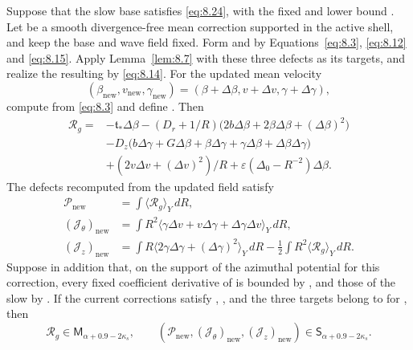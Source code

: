 \begin{lemma}\label{lem:8.8}
Suppose that the slow base satisfies \eqref{eq:8.24}, with the fixed
 and lower bound
. Let
 be a smooth divergence-free mean correction supported in
the active shell, and keep the base and wave field  fixed. Form
 and
 by Equations~\eqref{eq:8.3},
\eqref{eq:8.12} and \eqref{eq:8.15}. Apply Lemma~\ref{lem:8.7} with these three defects as its
targets, and realize the resulting  by \eqref{eq:8.14}. For the
updated mean velocity
\[
(\beta_{\mathrm{new}},v_{\mathrm{new}},\gamma_{\mathrm{new}})
=(\beta+\Delta\beta,v+\Delta v,\gamma+\Delta\gamma),
\]
%
compute  from \eqref{eq:8.3} and define
. Then
\begin{equation}
\begin{aligned}
\mathcal R_g={}&-\mathfrak t_*\Delta\beta
 -(D_r+1/R)\bigl(2b\Delta\beta+2\beta\Delta\beta+(\Delta\beta)^2\bigr)\\
&-D_z\bigl(b\Delta\gamma+G\Delta\beta+\beta\Delta\gamma
  +\gamma\Delta\beta+\Delta\beta\Delta\gamma\bigr)\\
&+(2v\Delta v+(\Delta v)^2)/R+\varepsilon(\Delta_0-R^{-2})\Delta\beta.
\end{aligned}
\tag{8.26}\label{eq:8.26}
\end{equation}
The defects recomputed from the updated field satisfy
\begin{equation}
\begin{aligned}
\mathcal P_{\mathrm{new}}&=\int\langle\mathcal R_g\rangle_Y\,dR,\\
(\mathcal J_\theta)_{\mathrm{new}}&=
 \int R^2\langle\gamma\Delta v+v\Delta\gamma+\Delta\gamma\Delta v\rangle_Y\,dR,\\
(\mathcal J_z)_{\mathrm{new}}&=
 \int R\langle2\gamma\Delta\gamma+(\Delta\gamma)^2\rangle_Y\,dR
 -\frac12\int R^2\langle\mathcal R_g\rangle_Y\,dR.
\end{aligned}
\tag{8.27}\label{eq:8.27}
\end{equation}
Suppose in addition that, on the support of the azimuthal potential for this correction, every fixed
coefficient derivative of  is bounded by
, and those of the slow
 by . If the current corrections
satisfy ,
, and the three targets belong to
 for , then
\[
\mathcal R_g\in \mathsf M_{\alpha+0.9-2\kappa_s},\qquad
(\mathcal P_{\mathrm{new}},(\mathcal J_\theta)_{\mathrm{new}},
 (\mathcal J_z)_{\mathrm{new}})\in \mathsf S_{\alpha+0.9-2\kappa_s}.
\]
\end{lemma}

